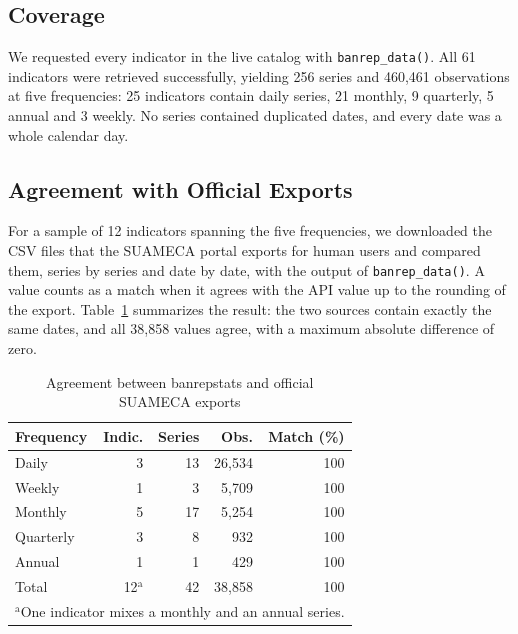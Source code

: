 \documentclass[conference]{IEEEtran}
\begin{document}
\subsection{Coverage}
We requested every indicator in the live catalog with
\texttt{banrep\_data()}. All 61 indicators were retrieved successfully,
yielding 256 series and 460,461 observations at five frequencies:
25 indicators contain daily series, 21 monthly, 9 quarterly, 5 annual and
3 weekly. No series contained duplicated dates, and every date was a
whole calendar day.

\subsection{Agreement with Official Exports}
For a sample of 12 indicators spanning the five frequencies, we
downloaded the CSV files that the SUAMECA portal exports for human users
and compared them, series by series and date by date, with the output of
\texttt{banrep\_data()}. A value counts as a match when it agrees with
the API value up to the rounding of the export.
Table~\ref{tab:official} summarizes the result: the two sources contain
exactly the same dates, and all 38,858 values agree, with a maximum
absolute difference of zero.

\begin{table}[htbp]
\caption{Agreement between banrepstats and official SUAMECA exports}
\begin{center}
\begin{tabular}{lrrrr}
\toprule
\textbf{Frequency} & \textbf{Indic.} & \textbf{Series} & \textbf{Obs.} & \textbf{Match (\%)} \\
\midrule
Daily      & 3 & 13 & 26,534 & 100 \\
Weekly     & 1 &  3 &  5,709 & 100 \\
Monthly    & 5 & 17 &  5,254 & 100 \\
Quarterly  & 3 &  8 &    932 & 100 \\
Annual     & 1 &  1 &    429 & 100 \\
\midrule
Total      & 12$^{\mathrm{a}}$ & 42 & 38,858 & 100 \\
\bottomrule
\multicolumn{5}{l}{$^{\mathrm{a}}$One indicator mixes a monthly and an annual series.}
\end{tabular}
\label{tab:official}
\end{center}
\end{table}
\end{document}
